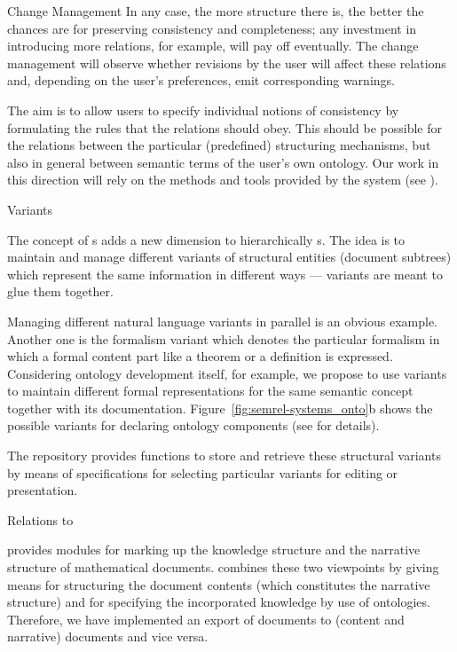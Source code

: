 \begin{omgroup}[id=MMiSS,creators={bkb,amahnke}]
\begin{omgroup}{Change Management}
In any case, the more structure there is, the better the chances are for preserving
consistency and completeness; any investment in introducing more {}
relations, for example, will pay off eventually. The change management will observe
whether revisions by the user will affect these relations and, depending on the user's
preferences, emit corresponding warnings.

The aim is to allow users to specify individual notions of consistency by formulating the
rules that the relations should obey. This should be possible for the relations between
the particular (predefined) structuring mechanisms, but also in general between semantic
terms of the user's own ontology. Our work in this direction will rely on the methods and
tools provided by the {\hets} system (see {}).
\end{omgroup}

\begin{omgroup}{Variants}

The concept of {s} adds a new dimension to hierarchically
{s}.  The idea is to maintain and manage different variants
of structural entities (document subtrees) which represent the same information in
different ways --- variants are meant to glue them together.

Managing different natural language variants in parallel is an obvious example.  Another
one is the formalism variant which denotes the particular formalism in which a formal
content part like a theorem or a definition is expressed. Considering ontology development
itself, for example, we propose to use variants to maintain different formal
representations for the same semantic concept together with its documentation.
Figure~\ref{fig:semrel-systems_onto}b shows the possible variants for declaring ontology
components (see \cite{WOSE-2004} for details).

The \MMISS{} repository provides functions to store and retrieve these structural variants
by means of specifications for selecting particular variants for editing or presentation.
\end{omgroup}

\begin{omgroup}{Relations to {\omdoc}}

{\omdoc} provides modules for marking up the knowledge structure and the narrative
structure of mathematical documents. \MMISS{} combines these two viewpoints by giving
means for structuring the document contents (which constitutes the narrative structure) and
for specifying the incorporated knowledge by use of ontologies. Therefore, we have
implemented an export of \MMISS{} documents to (content and narrative) {\omdoc} documents
and vice versa.
\end{omgroup}
\end{omgroup}
